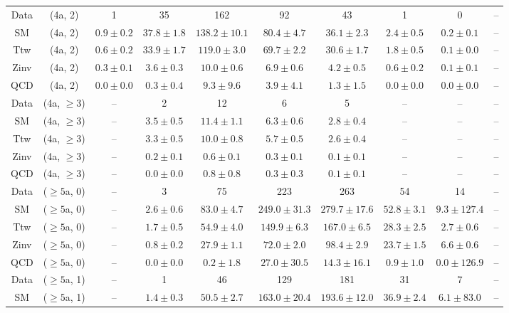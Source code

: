 \begin{table}[h!]
{\begin{tabular}{cccccccccc}
	Data & (4a, 2) & 1 & 35 & 162 & 92 & 43 & 1 & 0 & -- \\[0.5ex] 
	SM & (4a, 2) & $0.9\pm 0.2$ & $37.8\pm 1.8$ & $138.2\pm 10.1$ & $80.4\pm 4.7$ & $36.1\pm 2.3$ & $2.4\pm 0.5$ & $0.2\pm 0.1$ & -- \\[0.5ex] 
	Ttw & (4a, 2) & $0.6\pm 0.2$ & $33.9\pm 1.7$ & $119.0\pm 3.0$ & $69.7\pm 2.2$ & $30.6\pm 1.7$ & $1.8\pm 0.5$ & $0.1\pm 0.0$ & -- \\[0.5ex] 
	Zinv & (4a, 2) & $0.3\pm 0.1$ & $3.6\pm 0.3$ & $10.0\pm 0.6$ & $6.9\pm 0.6$ & $4.2\pm 0.5$ & $0.6\pm 0.2$ & $0.1\pm 0.1$ & -- \\[0.5ex] 
	QCD & (4a, 2) & $0.0\pm 0.0$ & $0.3\pm 0.4$ & $9.3\pm 9.6$ & $3.9\pm 4.1$ & $1.3\pm 1.5$ & $0.0\pm 0.0$ & $0.0\pm 0.0$ & -- \\[0.5ex] 
	Data & (4a, $\ge3$) & -- & 2 & 12 & 6 & 5 & -- & -- & -- \\[0.5ex] 
	SM & (4a, $\ge3$) & -- & $3.5\pm 0.5$ & $11.4\pm 1.1$ & $6.3\pm 0.6$ & $2.8\pm 0.4$ & -- & -- & -- \\[0.5ex] 
	Ttw & (4a, $\ge3$) & -- & $3.3\pm 0.5$ & $10.0\pm 0.8$ & $5.7\pm 0.5$ & $2.6\pm 0.4$ & -- & -- & -- \\[0.5ex] 
	Zinv & (4a, $\ge3$) & -- & $0.2\pm 0.1$ & $0.6\pm 0.1$ & $0.3\pm 0.1$ & $0.1\pm 0.1$ & -- & -- & -- \\[0.5ex] 
	QCD & (4a, $\ge3$) & -- & $0.0\pm 0.0$ & $0.8\pm 0.8$ & $0.3\pm 0.3$ & $0.1\pm 0.1$ & -- & -- & -- \\[0.5ex] 
	Data & ($\ge5$a, 0) & -- & 3 & 75 & 223 & 263 & 54 & 14 & -- \\[0.5ex] 
	SM & ($\ge5$a, 0) & -- & $2.6\pm 0.6$ & $83.0\pm 4.7$ & $249.0\pm 31.3$ & $279.7\pm 17.6$ & $52.8\pm 3.1$ & $9.3\pm 127.4$ & -- \\[0.5ex] 
	Ttw & ($\ge5$a, 0) & -- & $1.7\pm 0.5$ & $54.9\pm 4.0$ & $149.9\pm 6.3$ & $167.0\pm 6.5$ & $28.3\pm 2.5$ & $2.7\pm 0.6$ & -- \\[0.5ex] 
	Zinv & ($\ge5$a, 0) & -- & $0.8\pm 0.2$ & $27.9\pm 1.1$ & $72.0\pm 2.0$ & $98.4\pm 2.9$ & $23.7\pm 1.5$ & $6.6\pm 0.6$ & -- \\[0.5ex] 
	QCD & ($\ge5$a, 0) & -- & $0.0\pm 0.0$ & $0.2\pm 1.8$ & $27.0\pm 30.5$ & $14.3\pm 16.1$ & $0.9\pm 1.0$ & $0.0\pm 126.9$ & -- \\[0.5ex] 
	Data & ($\ge5$a, 1) & -- & 1 & 46 & 129 & 181 & 31 & 7 & -- \\[0.5ex] 
	SM & ($\ge5$a, 1) & -- & $1.4\pm 0.3$ & $50.5\pm 2.7$ & $163.0\pm 20.4$ & $193.6\pm 12.0$ & $36.9\pm 2.4$ & $6.1\pm 83.0$ & -- \\[0.5ex] 

\end{tabular}}
\end{table}
